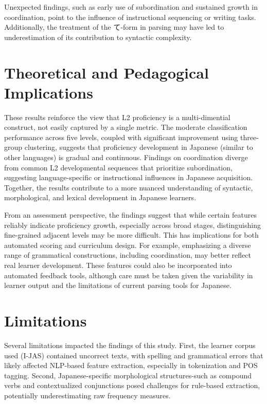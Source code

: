 Unexpected findings, such as early use of subordination and sustained growth in coordination, point to the influence
of instructional sequencing or writing tasks. Additionally, the treatment of the て-form in parsing may have led to
underestimation of its contribution to syntactic complexity.

\section{Theoretical and Pedagogical Implications}
These results reinforce the view that L2 proficiency is a multi-dimential construct, not easily captured by a single
metric. The moderate classification performance across five levels, coupled with significant improvement using
three-group clustering, suggests that proficiency development in Japanese (similar to other languages) is gradual and
continuous. Findings on coordination diverge from common L2 developmental sequences that prioritize subordination,
suggesting language-specific or instructional influences in Japanese acquisition. Together, the results contribute
to a more nuanced understanding of syntactic, morphological, and lexical development in Japanese learners.

From an assessment perspective, the findings suggest that while certain features reliably indicate proficiency
growth, especially across broad stages, distinguishing fine-grained adjacent levels may be more difficult. This has
implications for both automated scoring and curriculum design. For example, emphasizing a diverse range of
grammatical constructions, including coordination, may better reflect real learner development. These features could
also be incorporated into automated feedback tools, although care must be
taken given the variability in learner
output and the limitations of current parsing tools for Japanese.

\section{Limitations}

Several limitations impacted the findings of this study. First, the learner corpus used (I-JAS) contained uncorrect
texts, with spelling and grammatical errors that likely affected NLP-based feature extraction, especially in
tokenization and POS tagging. Second, Japanese-specific morphological structures-such as compound verbs and
contextualized conjunctions posed challenges for rule-based extraction, potentially underestimating raw frequency
measures. 

